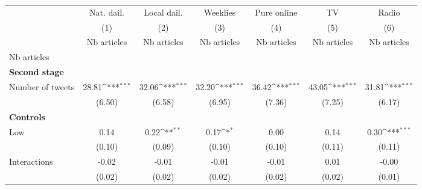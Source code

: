 {
\def\sym#1{\ifmmode^{#1}\else\(^{#1}\)\fi}
\begin{tabular}{l*{6}{c}}
\hline\hline
                    &\multicolumn{1}{c}{Nat. dail.}&\multicolumn{1}{c}{Local dail.}&\multicolumn{1}{c}{Weeklies}&\multicolumn{1}{c}{Pure online}&\multicolumn{1}{c}{TV}&\multicolumn{1}{c}{Radio}\\\cmidrule(lr){2-2}\cmidrule(lr){3-3}\cmidrule(lr){4-4}\cmidrule(lr){5-5}\cmidrule(lr){6-6}\cmidrule(lr){7-7}
                    &\multicolumn{1}{c}{(1)}&\multicolumn{1}{c}{(2)}&\multicolumn{1}{c}{(3)}&\multicolumn{1}{c}{(4)}&\multicolumn{1}{c}{(5)}&\multicolumn{1}{c}{(6)}\\
                    &\multicolumn{1}{c}{Nb articles}&\multicolumn{1}{c}{Nb articles}&\multicolumn{1}{c}{Nb articles}&\multicolumn{1}{c}{Nb articles}&\multicolumn{1}{c}{Nb articles}&\multicolumn{1}{c}{Nb articles}\\
\hline
Nb articles         &                     &                     &                     &                     &                     &                     \\
\textbf{Second stage}&                     &                     &                     &                     &                     &                     \\
Number of tweets    &       28.81\sym{***}&       32.06\sym{***}&       32.20\sym{***}&       36.42\sym{***}&       43.05\sym{***}&       31.81\sym{***}\\
                    &      (6.50)         &      (6.58)         &      (6.95)         &      (7.36)         &      (7.25)         &      (6.17)         \\
\textbf{Controls}   &                     &                     &                     &                     &                     &                     \\
Low                 &        0.14         &        0.22\sym{**} &        0.17\sym{*}  &        0.00         &        0.14         &        0.30\sym{***}\\
                    &      (0.10)         &      (0.09)         &      (0.10)         &      (0.10)         &      (0.11)         &      (0.11)         \\
Interactions        &       -0.02         &       -0.01         &       -0.01         &       -0.01         &        0.01         &       -0.00         \\
                    &      (0.02)         &      (0.02)         &      (0.02)         &      (0.02)         &      (0.02)         &      (0.01)         \\

\end{tabular}}
